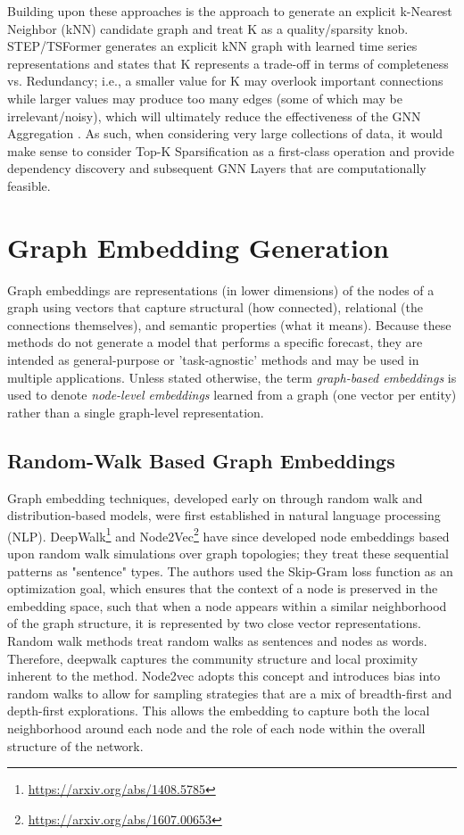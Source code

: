 Building upon these approaches is the approach to generate an explicit k-Nearest Neighbor (kNN) candidate graph and treat K as a quality/sparsity knob. STEP/TSFormer generates an explicit kNN graph with learned time series representations and states that K represents a trade-off in terms of completeness vs. Redundancy; i.e., a smaller value for K may overlook important connections while larger values may produce too many edges (some of which may be irrelevant/noisy), which will ultimately reduce the effectiveness of the GNN Aggregation \cite{10.1145/3534678.3539396}. As such, when considering very large collections of data, it would make sense to consider Top-K Sparsification as a first-class operation and provide dependency discovery and subsequent GNN Layers that are computationally feasible.




\section{Graph Embedding Generation}
\label{sec:graph_embedding_generation}

Graph embeddings are representations (in lower dimensions) of the nodes of a graph using vectors that capture structural (how connected), relational (the connections themselves), and semantic properties (what it means). Because these methods do not generate a model that performs a specific forecast, they are intended as general-purpose or 'task-agnostic' methods and may be used in multiple applications.
Unless stated otherwise, the term \emph{graph-based embeddings} is used to denote \emph{node-level embeddings} learned from a graph (one vector per entity) rather than a single graph-level representation.



\subsection{Random-Walk Based Graph Embeddings}
Graph embedding techniques, developed early on through random walk and distribution-based models, were first established in natural language processing (NLP). DeepWalk\footnote{\url{https://arxiv.org/abs/1408.5785}} and Node2Vec\footnote{\url{https://arxiv.org/abs/1607.00653}} have since developed node embeddings based upon random walk simulations over graph topologies; they treat these sequential patterns as "sentence" types. The authors used the Skip-Gram loss function as an optimization goal, which ensures that the context of a node is preserved in the embedding space, such that when a node appears within a similar neighborhood of the graph structure, it is represented by two close vector representations.
Random walk methods treat random walks as sentences and nodes as words. Therefore, deepwalk captures the community structure and local proximity inherent to the method. Node2vec adopts this concept and introduces bias into random walks to allow for sampling strategies that are a mix of breadth-first and depth-first explorations. This allows the embedding to capture both the local neighborhood around each node and the role of each node within the overall structure of the network.

